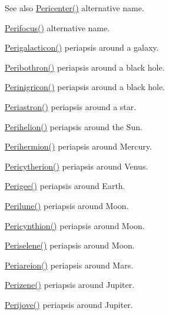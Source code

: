 \begin{DoxySeeAlso}{See also}
\mbox{\hyperlink{group___e_g_x_phys-_periapsis_gac4c419a87a5802cf6afc98f50792e99f}{Pericenter()}} alternative name. 

\mbox{\hyperlink{group___e_g_x_phys-_periapsis_gaff62669fb364a245cb85f9a91d8ea71f}{Perifocus()}} alternative name. 

\mbox{\hyperlink{group___e_g_x_phys-_periapsis_ga074fecab96b90bebffa512a37e52d90b}{Perigalacticon()}} periapsis around a galaxy. 

\mbox{\hyperlink{group___e_g_x_phys-_periapsis_gada5892309279a3a687c4eb2f88238e4e}{Peribothron()}} periapsis around a black hole. 

\mbox{\hyperlink{group___e_g_x_phys-_periapsis_ga99d86af90179994e17158b082c502fd4}{Perinigricon()}} periapsis around a black hole. 

\mbox{\hyperlink{group___e_g_x_phys-_periapsis_ga477de6824cbb5986cdae923141e21648}{Periastron()}} periapsis around a star. 

\mbox{\hyperlink{group___e_g_x_phys-_periapsis_ga941d285e3a0b48ada9c9f60925ff63c2}{Perihelion()}} periapsis around the Sun. 

\mbox{\hyperlink{group___e_g_x_phys-_periapsis_ga9562e9cbfd73019ae9cdaa643b843d63}{Perihermion()}} periapsis around Mercury. 

\mbox{\hyperlink{group___e_g_x_phys-_periapsis_gaa270e364cbbd7d3d6212872df484926f}{Pericytherion()}} periapsis around Venus. 

\mbox{\hyperlink{group___e_g_x_phys-_periapsis_gae2d053caf69cb0b4c3207064a2ab143a}{Perigee()}} periapsis around Earth. 

\mbox{\hyperlink{group___e_g_x_phys-_periapsis_ga2cc7ab05e18d32c94d8d74972e032793}{Perilune()}} periapsis around Moon. 

\mbox{\hyperlink{group___e_g_x_phys-_periapsis_gaeeba153b188cd06cbd233eaef12f0a6a}{Pericynthion()}} periapsis around Moon. 

\mbox{\hyperlink{group___e_g_x_phys-_periapsis_ga255874374dde571531e443cdbef9ef0c}{Periselene()}} periapsis around Moon. 

\mbox{\hyperlink{group___e_g_x_phys-_periapsis_ga0617ba07a30b0fd0544c02f691bfae26}{Periareion()}} periapsis around Mars. 

\mbox{\hyperlink{group___e_g_x_phys-_periapsis_ga0523c65b7fc26e675388b2c3d38aa00b}{Perizene()}} periapsis around Jupiter. 

\mbox{\hyperlink{group___e_g_x_phys-_periapsis_ga075052f7ff9aa1d5fdf4501b493be86b}{Perijove()}} periapsis around Jupiter. 


\end{DoxySeeAlso}
